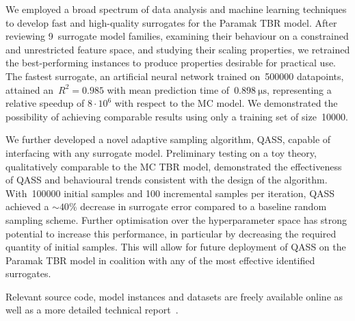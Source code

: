 We employed a broad spectrum of data
analysis and machine learning techniques to develop fast and high-quality
surrogates for the Paramak TBR model. After reviewing
9~surrogate model families, examining their behaviour on a constrained and
unrestricted feature space, and studying their scaling properties, we retrained
the best-performing instances to produce properties desirable for
practical use. The fastest surrogate, an artificial neural network trained
on~\num{500000} datapoints, attained an~$R^2=\num{0.985}$ with mean prediction time
of~$\SI{0.898}{\micro\second}$, representing a relative
speedup of $8\cdot 10^6$ with respect to the MC model. We demonstrated the possibility of achieving comparable results using only a
training set of size~\num{10000}.

We further developed a novel adaptive
sampling algorithm, QASS, capable of interfacing with any surrogate model.
Preliminary testing on a toy theory, qualitatively comparable to
the MC TBR model, demonstrated the effectiveness of QASS and behavioural trends
consistent with the design of the algorithm. With~\num{100000} initial samples
and 100 incremental samples per iteration, QASS achieved a ${\sim}40\%$ decrease
in surrogate error compared to a baseline random sampling scheme. Further optimisation over the hyperparameter space has strong potential to increase this performance, in particular by decreasing the required quantity of initial samples. This will allow for future deployment of QASS on the Paramak TBR model in coalition with any of the most effective identified surrogates.

Relevant source code, model instances and datasets are freely
available online as well as a more detailed technical
report~\cite{github,finalreport}.
